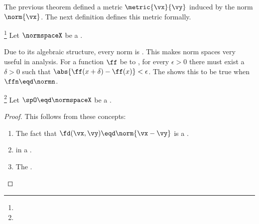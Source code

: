 The previous theorem defined a metric $\metric{\vx}{\vy}$ induced by the norm $\norm{\vx}$.
The next definition defines this metric formally.
\begin{definition}
\label{def:d=norm}
\footnote{
  }
Let $\normspaceX$ be a  .
\end{definition}


Due to its algebraic structure, every norm is  .
This makes norm spaces very useful in analysis.
For a function $\ff$ be to , for every $\epsilon>0$ there must exist a $\delta>0$ such that
$\abs{\ff(x+\delta)-\ff(x)}<\epsilon$.
The   shows this to be true when $\ffn\eqd\normn$.


\begin{corollary}
\label{cor:norm_continuous}
\footnote{
  }
Let $\spO\eqd\normspaceX$ be a  .
\end{corollary}
\begin{proof}
This follows from these concepts:
\begin{enumerate}
  \item The fact that $\fd(\vx,\vy)\eqd\norm{\vx-\vy}$ is a  .
  \item {} in a . %
  \item The  .
\end{enumerate}
\end{proof}

